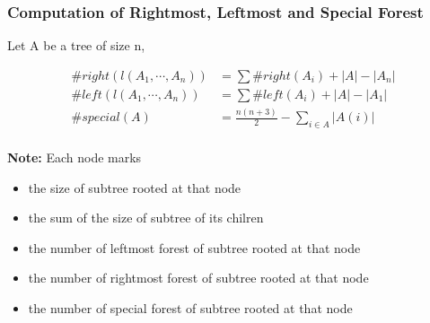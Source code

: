\documentclass{beamer}
\begin{document}
\begin{frame}
\frametitle{Computation of Rightmost, Leftmost and Special Forest}
Let A be a tree of size n,

\begin{align*}
\#right(l(A_1,\cdots, A_n)) &= \sum\#right(A_i) + \left\vert A \right\vert - \left\vert A_n \right\vert \\
\#left(l(A_1,\cdots, A_n)) &= \sum\#left(A_i) + \left\vert A \right\vert - \left\vert A_1 \right\vert \\
\#special(A) &= \frac{n(n+3)}{2} - \sum_{i \in A} \left\vert A(i) \right\vert \\
\end{align*}

\textbf{Note:}
Each node marks
\begin{itemize}
\item the size of subtree rooted at that node
\item the sum of the size of subtree of its chilren
\item the number of leftmost forest of subtree rooted at that node
\item the number of rightmost forest of subtree rooted at that node
\item the number of special forest of subtree rooted at that node
\end{itemize} 

\end{frame}
\end{document}
